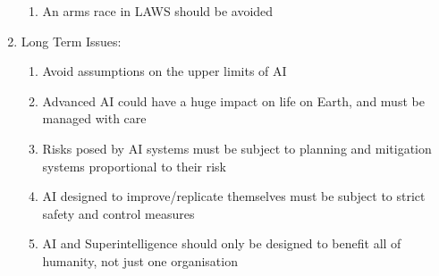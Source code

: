 \begin{enumerate}
\begin{enumerate}
        \item An arms race in LAWS should be avoided
    \end{enumerate}
    \item Long Term Issues:
    \begin{enumerate}
        \item Avoid assumptions on the upper limits of AI
        \item Advanced AI could have a huge impact on life on Earth, and must be managed with care
        \item Risks posed by AI systems must be subject to planning and mitigation systems proportional to their risk
        \item AI designed to improve/replicate themselves must be subject to strict safety and control measures
        \item AI and Superintelligence should only be designed to benefit all of humanity, not just one organisation
    \end{enumerate}
\end{enumerate}